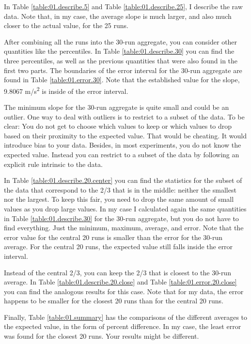 In Table \ref{table:01.describe.5} and Table \ref{table:01.describe.25}, I describe the raw data. Note that, in my case, the average slope is much larger, and also much closer to the actual value, for the 25 runs.

After combining all the runs into the 30-run aggregate, you can consider other quantities like the percentiles. In Table \ref{table:01.describe.30} you can find the three percentiles, as well as the previous quantities that were also found in the first two parts. The boundaries of the error interval for the 30-run aggregate are found in Table \ref{table:01.error.30}. Note that the established value for the slope, 9.8067 m/s\textsuperscript{2} is inside of the error interval.

The minimum slope for the 30-run aggregate is quite small and could be an outlier. One way to deal with outliers is to restrict to a subset of the data. To be clear: You do not get to choose which values to keep or which values to drop based on their proximity to the expected value. That would be cheating. It would introduce bias to your data. Besides, in most experiments, you do not know the expected value. Instead you can restrict to a subset of the data by following an explicit rule intrinsic to the data.

In Table \ref{table:01.describe.20.center} you can find the statistics for the subset of the data that correspond to the 2/3 that is in the middle: neither the smallest nor the largest. To keep this fair, you need to drop the same amount of small values as you drop large values. In my case I calculated again the same quantities in Table \ref{table:01.describe.30} for the 30-run aggregate, but you do not have to find everything. Just the minimum, maximum, average, and error. Note that the error value for the central 20 runs is smaller than the error for the 30-run average. For the central 20 runs, the expected value still falls inside the error interval.

Instead of the central 2/3, you can keep the 2/3 that is closest to the 30-run average. In Table \ref{table:01.describe.20.close} and Table \ref{table:01.error.20.close} you can find the analogous results for this case. Note that for my data, the error happens to be smaller for the closest 20 runs than for the central 20 runs.

Finally, Table \ref{table:01.summary} has the comparisons of the different averages to the expected value, in the form of percent difference. In my case, the least error was found for the closest 20 runs. Your results might be different.
%
